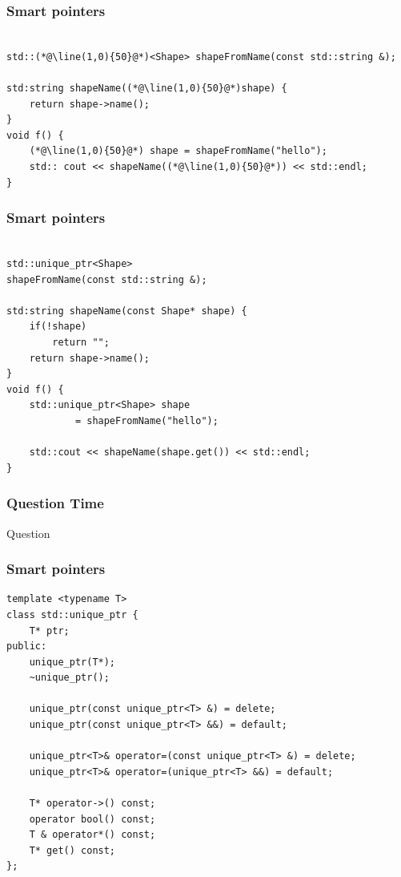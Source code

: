 \documentclass[xetex,mathserif]{beamer}
\newcounter{QC}
\begin{document}
\begin{frame}[fragile]
\frametitle{Smart pointers}

\begin{lstlisting}

std::(*@\line(1,0){50}@*)<Shape> shapeFromName(const std::string &);

std:string shapeName((*@\line(1,0){50}@*)shape) {
    return shape->name();
}
void f() {
    (*@\line(1,0){50}@*) shape = shapeFromName("hello");
    std:: cout << shapeName((*@\line(1,0){50}@*)) << std::endl;
}
\end{lstlisting}
\end{frame}

\begin{frame}[fragile]
\frametitle{Smart pointers}

\begin{lstlisting}

std::unique_ptr<Shape> 
shapeFromName(const std::string &);

std:string shapeName(const Shape* shape) {
    if(!shape)
        return "";
    return shape->name();
}
void f() {
    std::unique_ptr<Shape> shape 
            = shapeFromName("hello");
    
    std::cout << shapeName(shape.get()) << std::endl;
}
\end{lstlisting}

\end{frame}

\begin{frame}
\frametitle{Question Time}
\huge Question  
\end{frame}


\begin{frame}[fragile]
\frametitle{Smart pointers}

\begin{lstlisting}
template <typename T>
class std::unique_ptr {
    T* ptr;
public:
    unique_ptr(T*);
    ~unique_ptr();
 
    unique_ptr(const unique_ptr<T> &) = delete;
    unique_ptr(const unique_ptr<T> &&) = default;
    
    unique_ptr<T>& operator=(const unique_ptr<T> &) = delete;
    unique_ptr<T>& operator=(unique_ptr<T> &&) = default;
    
    T* operator->() const; 	
    operator bool() const;
    T & operator*() const;
    T* get() const;
};
\end{lstlisting}

\end{frame}
\end{document}
